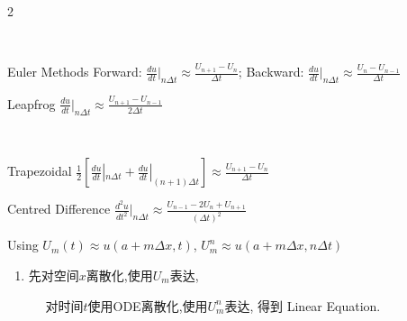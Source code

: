 \documentclass{note}
\begin{document}
\begin{multicols}{2}
{{    \begin{MyTh}{}\tiny
         \ \ \tiny {}
        
        \qquad\qquad\qquad\qquad {}
    \end{MyTh}

    \begin{MyTh}{Euler Methods}\tiny
        Forward: $\frac{du}{dt}|_{n\Delta t}\approx \frac{U_{n+1}-U_n}{\Delta t}$; \quad Backward: $\frac{du}{dt}|_{n\Delta t}\approx \frac{U_{n}-U_{n-1}}{\Delta t}$
    \end{MyTh}

    \begin{MyTh}{Leapfrog}\tiny
        $\frac{du}{dt}|_{n\Delta t}\approx \frac{U_{n+1}-U_{n-1}}{2\Delta t}$
    \end{MyTh}
    \ \
    \begin{MyTh}{Trapezoidal}\tiny
        $\frac12[\frac{du}{dt}|_{n\Delta t}+\frac{du}{dt}|_{(n+1)\Delta t}]\approx \frac{U_{n+1}-U_n}{\Delta t}$
    \end{MyTh}

    \begin{MyTh}{Centred Difference}\tiny
        $\frac{d^2u}{dt^2}|_{n\Delta t}\approx \frac{U_{n-1}-2U_n+U_{n+1}}{(\Delta t)^2}$
    \end{MyTh}

    \begin{MyTh}{}\tiny
        Using $U_m(t)\approx u(a+m\Delta x,t)$, $U_m^n\approx u(a+m\Delta x,n\Delta t)$ \quad {}

        \vspace{-2pt}
        \begin{enumerate}
            \item {}  先对空间$x$离散化,使用$U_m$表达, \qquad {}
            
            \vspace{-4pt}
            \qquad\quad \ \  对时间$t$使用ODE离散化,使用$U_m^n$表达, 得到 Linear Equation.
            

\end{enumerate}
\end{MyTh}}}
\end{multicols}
\end{document}
